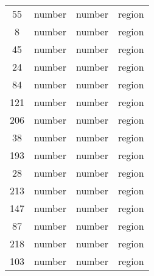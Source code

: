 \documentclass[12pt]{article}\usepackage[]{graphicx}\usepackage[]{color}
\begin{document}
\begin{longtable}[c]{cccc}
	55 & number & number & region \\
	8 & number & number & region \\
	45 & number & number & region \\
	24 & number & number & region \\
	84 & number & number & region \\
	121 & number & number & region \\
	206 & number & number & region \\
	38 & number & number & region \\
	193 & number & number & region \\
	28 & number & number & region \\
	213 & number & number & region \\
	147 & number & number & region \\
	87 & number & number & region \\
	218 & number & number & region \\
	103 & number & number & region \\
\end{longtable}
\end{document}
